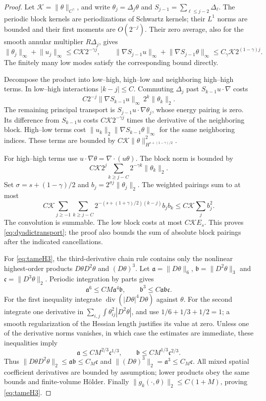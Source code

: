 \documentclass[11pt]{amsart}
\theoremstyle{remark}
\numberwithin{equation}{section}
\newcommand{\norm}[1]{\lVert#1\rVert}
\begin{document}
\begin{proof}
Let $\mathcal K=\norm{\theta}_{C^\gamma}$, and write $\theta_j=\Delta_j\theta$
and $S_{j-1}=\sum_{\ell\leq j-2}\Delta_\ell$. The periodic block kernels
are periodizations of Schwartz kernels; their $L^1$ norms are bounded and
their first moments are $O(2^{-j})$. Their zero average, also for the smooth
annular multiplier $R\Delta_j$, gives
\[
 \norm{\theta_j}_\infty+\norm{u_j}_\infty
       \leq C\mathcal K2^{-\gamma j},\qquad
 \norm{\nabla S_{j-1}u}_\infty+
 \norm{\nabla S_{j-1}\theta}_\infty
       \leq C_\gamma\mathcal K2^{(1-\gamma)j}.
\]
The finitely many low modes satisfy the corresponding bound directly.

Decompose the product into low--high, high--low and neighboring high--high
terms. In low--high interactions $|k-j|\leq C$. Commuting $\Delta_j$
past $S_{k-1}u\cdot\nabla$ costs
\[
 C2^{-j}\norm{\nabla S_{k-1}u}_\infty\,2^k\norm{\theta_k}_2.
\]
The remaining principal transport is $S_{j-1}u\cdot\nabla\theta_j$,
whose energy pairing is zero. Its difference from $S_{k-1}u$ costs
$C\mathcal K2^{-\gamma j}$ times the derivative of the neighboring block.
High--low terms cost
$\norm{u_k}_2\norm{\nabla S_{k-1}\theta}_\infty$ for the same neighboring
indices. These terms are bounded by
$C\mathcal K\norm{\theta}_{H^{s+(1-\gamma)/2}}^2$.

For high--high terms use $u\cdot\nabla\theta=\nabla\cdot(u\theta)$.
The block norm is bounded by
\[
 C\mathcal K2^j\sum_{k\geq j-C}2^{-\gamma k}\norm{\theta_k}_2.
\]
Set $\sigma=s+(1-\gamma)/2$ and $b_j=2^{\sigma j}\norm{\theta_j}_2$.
The weighted pairings sum to at most
\[
 C\mathcal K\sum_{j\geq-1}\sum_{k\geq j-C}
       2^{-(s+(1+\gamma)/2)(k-j)}b_jb_k
       \leq C\mathcal K\sum_jb_j^2.
\]
The convolution is summable. The low block costs at most $C\mathcal K E_s$.
This proves \eqref{eq:dyadictransport}; the proof also bounds the sum of
absolute block pairings after the indicated cancellations.

For \eqref{eq:tameH3}, the third-derivative chain rule contains only the
nonlinear highest-order products $D\theta D^2\theta$ and $(D\theta)^3$.
Let $\mathfrak a=\norm{D\theta}_6$, $\mathfrak b=\norm{D^2\theta}_3$
and $\mathfrak c=\norm{D^3\theta}_2$. Periodic integration by parts gives
\[
 \mathfrak a^6\leq CM\mathfrak a^4\mathfrak b,
 \qquad \mathfrak b^3\leq C\mathfrak a\mathfrak b\mathfrak c.
\]
For the first inequality integrate
$\operatorname{div}(|D\theta|^4D\theta)$ against $\theta$.
For the second integrate one derivative in
$\sum_{i,j}\int\theta_{ij}^2|D^2\theta|$, and use
$1/6+1/3+1/2=1$; a smooth regularization of the Hessian length justifies
its value at zero. Unless one of the derivative norms vanishes, in which
case the estimates are immediate, these inequalities imply
\[
 \mathfrak a\leq CM^{2/3}\mathfrak c^{1/3},\qquad
 \mathfrak b\leq CM^{1/3}\mathfrak c^{2/3}.
\]
Thus $\norm{D\theta D^2\theta}_2\leq\mathfrak a\mathfrak b\leq C_M\mathfrak c$
and $\norm{(D\theta)^3}_2=\mathfrak a^3\leq C_M\mathfrak c$.
All mixed spatial coefficient derivatives are bounded by assumption; lower
products obey the same bounds and finite-volume H\"older. Finally
$\norm{g_k(\cdot,\theta)}_2\leq C(1+M)$, proving \eqref{eq:tameH3}.
\end{proof}
\end{document}
